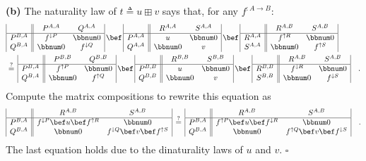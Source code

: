 \textbf{(b)} The naturality law of $t\triangleq u\boxplus v$ says
that, for any $f^{:A\rightarrow B}$:
\begin{align*}
 & \begin{array}{|c||cc|}
 & P^{A,A} & Q^{A,A}\\
\hline P^{B,A} & f^{\downarrow P} & \bbnum 0\\
Q^{B,A} & \bbnum 0 & f^{\downarrow Q}
\end{array}\,\bef\,\begin{array}{|c||cc|}
 & R^{A,A} & S^{A,A}\\
\hline P^{A,A} & u & \bbnum 0\\
Q^{A,A} & \bbnum 0 & v
\end{array}\,\bef\,\begin{array}{|c||cc|}
 & R^{A,B} & S^{A,B}\\
\hline R^{A,A} & f^{\uparrow R} & \bbnum 0\\
S^{A,A} & \bbnum 0 & f^{\uparrow S}
\end{array}\\
 & \overset{?}{=}\,\begin{array}{|c||cc|}
 & P^{B,B} & Q^{B,B}\\
\hline P^{B,A} & f^{\uparrow P} & \bbnum 0\\
Q^{B,A} & \bbnum 0 & f^{\uparrow Q}
\end{array}\,\bef\,\begin{array}{|c||cc|}
 & R^{B,B} & S^{B,B}\\
\hline P^{B,B} & u & \bbnum 0\\
Q^{B,B} & \bbnum 0 & v
\end{array}\,\bef\,\begin{array}{|c||cc|}
 & R^{A,B} & S^{A,B}\\
\hline R^{B,B} & f^{\downarrow R} & \bbnum 0\\
S^{B,B} & \bbnum 0 & f^{\downarrow S}
\end{array}\quad.
\end{align*}
Compute the matrix compositions to rewrite this equation as
\[
\begin{array}{|c||cc|}
 & R^{A,B} & S^{A,B}\\
\hline P^{B,A} & f^{\downarrow P}\bef u\bef f^{\uparrow R} & \bbnum 0\\
Q^{B,A} & \bbnum 0 & f^{\downarrow Q}\bef v\bef f^{\uparrow S}
\end{array}\,\overset{?}{=}\,\begin{array}{|c||cc|}
 & R^{A,B} & S^{A,B}\\
\hline P^{B,A} & f^{\uparrow P}\bef u\bef f^{\downarrow R} & \bbnum 0\\
Q^{B,A} & \bbnum 0 & f^{\uparrow Q}\bef v\bef f^{\downarrow S}
\end{array}\quad.
\]
The last equation holds due to the dinaturality laws of $u$ and $v$.
$\square$

